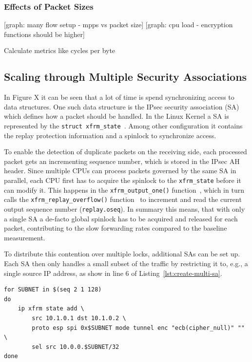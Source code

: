 \documentclass[IN,11pt,twoside,openright,master,english]{tumthesis}
\begin{document}
\subsubsection{Effects of Packet Sizes}
[graph: many flow setup - mpps vs packet size]
[graph: cpu load - encryption functions should be higher]

Calculate metrics like cycles per byte


\subsection{Scaling through Multiple Security Associations}
In Figure X it can be seen that a lot of time is spend synchronizing access to data structures. One such data structure is the IPsec security association (SA) which defines how a packet should be handled. In the Linux Kernel a SA is represented by the \texttt{struct xfrm\_state}~\cite{linux-xfrm-struct}. Among other configuration it contains the replay protection information and a spinlock to synchronize access. 

To enable the detection of duplicate packets on the receiving side, each processed packet gets an incrementing sequence number, which is stored in the IPsec AH header. 
Since multiple CPUs can process packets governed by the same SA in parallel, each CPU first has to acquire the spinlock to the \texttt{xfrm\_state} before it can modify it. This happens in the \texttt{xfrm\_output\_one()} function~\cite{linux-xfrm-output}, which in turn calls the \texttt{xfrm\_replay\_overflow()} function~\cite{linux-xfrm-replay-overflow} to increment and read the current output sequence number (\texttt{replay.oseq}).
In summary this means, that with only a single SA a de-facto global spinlock has to be acquired and released for each packet, contributing to the slow forwarding rates compared to the baseline measurement.

To distribute this contention over multiple locks, additional SAs can be set up. Each SA then only handles a small subset of the traffic by restricting it to, e.g., a single source IP address, as show in line 6 of Listing~\ref{lst:create-multi-sa}.

\begin{lstlisting}[caption={iproute2 command to create 128 SAs},captionpos=b,label={lst:create-multi-sa}]
for SUBNET in $(seq 2 1 128)
do
	ip xfrm state add \
		src 10.1.0.1 dst 10.1.0.2 \
		proto esp spi 0x$SUBNET mode tunnel enc "ecb(cipher_null)" "" \
		sel src 10.0.0.$SUBNET/32
done
\end{lstlisting}
\end{document}

